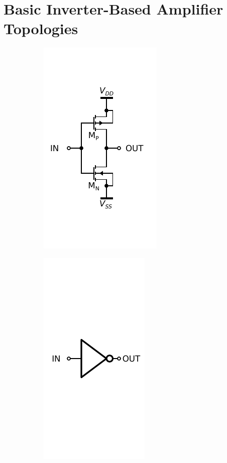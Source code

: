 \documentclass[conference]{IEEEtran}
\begin{document}
	\FloatBarrier
	
	\section{Basic Inverter-Based Amplifier Topologies}\label{sc:basic}
	
	\begin{figure}[htbp]
		\centering
		\begin{subfigure}[b]{0.49\columnwidth}
			\centerline{\includegraphics[scale=0.50]{circuits/inv_sch.pdf}}
			\caption{}
			\label{fig:inv:schematic}
		\end{subfigure}
		\begin{subfigure}[b]{0.49\columnwidth}
			\centerline{\includegraphics[scale=0.50]{circuits/inv_symbol.pdf}}

\end{subfigure}
\end{figure}
\end{document}

